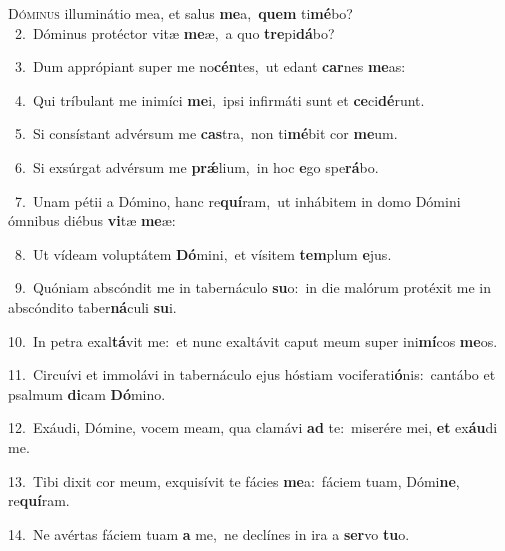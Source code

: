 \lettrine{\initial\textcolor{\initialcolor}{D}}{óminus} illuminátio mea, et salus \textbf{me}\-a,~\star \textbf{quem} ti\-\textbf{mé}\-bo?\\
{\numbfont\textcolor{\numbcolor}{~2.}}~Dóminus protéctor vitæ \textbf{me}\-æ,~\star a quo \textbf{tre}\-pi\-\textbf{dá}\-bo?\par
{\numbfont\textcolor{\numbcolor}{~3.}}~Dum apprópiant super me no\-\textbf{cén}\-tes,~\star ut edant \textbf{car}\-nes \textbf{me}\-as:\par
{\numbfont\textcolor{\numbcolor}{~4.}}~Qui tríbulant me inimíci \textbf{me}\-i,~\star ipsi infirmáti sunt et \textbf{ce}\-ci\-\textbf{dé}\-runt.\par
{\numbfont\textcolor{\numbcolor}{~5.}}~Si consístant advérsum me \textbf{cas}\-tra,~\star non ti\-\textbf{mé}\-bit cor \textbf{me}\-um.\par
{\numbfont\textcolor{\numbcolor}{~6.}}~Si exsúrgat advérsum me \textbf{prǽ}\-lium,~\star in hoc \textbf{e}\-go spe\-\textbf{rá}\-bo.\par
{\numbfont\textcolor{\numbcolor}{~7.}}~Unam pétii a Dómino, hanc re\-\textbf{quí}\-ram,~\star ut inhábitem in domo Dómini ómnibus diébus \textbf{vi}\-tæ \textbf{me}\-æ:\par
{\numbfont\textcolor{\numbcolor}{~8.}}~Ut vídeam voluptátem \textbf{Dó}\-mini,~\star et vísitem \textbf{tem}\-plum \textbf{e}\-jus.\par
{\numbfont\textcolor{\numbcolor}{~9.}}~Quóniam abscóndit me in tabernáculo \textbf{su}\-o:~\star in die malórum protéxit me in abscóndito taber\-\textbf{ná}\-culi \textbf{su}\-i.\par
{\numbfont\textcolor{\numbcolor}{10.}}~In petra exal\-\textbf{tá}\-vit me:~\star et nunc exaltávit caput meum super ini\-\textbf{mí}\-cos \textbf{me}\-os.\par
{\numbfont\textcolor{\numbcolor}{11.}}~Circuívi et immolávi in tabernáculo ejus hóstiam vociferati\-\textbf{ó}\-nis:~\star cantábo et psalmum \textbf{di}\-cam \textbf{Dó}\-mino.\par
{\numbfont\textcolor{\numbcolor}{12.}}~Exáudi, Dómine, vocem meam, qua clamávi \textbf{ad} te:~\star miserére mei, \textbf{et} ex\-\textbf{áu}\-di me.\par
{\numbfont\textcolor{\numbcolor}{13.}}~Tibi dixit cor meum, exquisívit te fácies \textbf{me}\-a:~\star fáciem tuam, Dómi\-\textbf{ne}\-, re\-\textbf{quí}\-ram.\par
{\numbfont\textcolor{\numbcolor}{14.}}~Ne avértas fáciem tuam \textbf{a} me,~\star ne declínes in ira a \textbf{ser}\-vo \textbf{tu}\-o.\par

